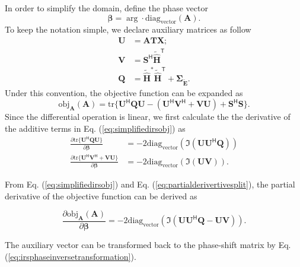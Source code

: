 \documentclass[12pt,draftclsnofoot,onecolumn,journal]{IEEEtran}
\begin{document}
In order to simplify the domain, define the phase vector
\begin{equation}
\boldsymbol \beta=\arg \cdot \mathrm{diag_{vector}}(\mathbf A).
\end{equation}
To keep the notation simple, we declare auxiliary matrices as follow
\begin{equation}
\begin{split}
\mathbf U&= \mathbf{ATX};\\
\mathbf V&=\mathbf S^{\mathsf H}\tilde{\hat{\mathbf H}}^{\mathsf T}\\
\mathbf Q&=\tilde{\hat{\mathbf H}}^*\tilde{\hat{\mathbf H}}^{\mathsf T}+
\pmb{\Sigma_{\tilde{\mathbf E}}}.
\end{split}
\label{eq:irsgdsimplifiedsymbols}
\end{equation}
Under this convention, the objective function can be expanded as 
\begin{equation}
\mathrm{obj_{\mathbf A}}(\mathbf A)=\mathrm{tr}\{\mathbf U^{\mathsf H}\mathbf Q \mathbf U- (\mathbf U^{\mathsf H}\mathbf V^{\mathsf H}+\mathbf{VU})+\mathbf S^{\mathsf H}\mathbf S\}.
\label{eq:simplifiedirsobj}
\end{equation}
Since the differential operation is linear, we first calculate the the derivative of the additive terms in Eq. (\ref{eq:simplifiedirsobj}) as
\begin{equation}
\begin{split}
\frac{\partial \mathrm{tr}\{\mathbf U^{\mathsf H}\mathbf Q \mathbf U\}}{\partial\boldsymbol\beta} &= -2\mathrm{diag_{vector}}(\Im(\mathbf{UU^{\mathsf H}Q}))\\
\frac{\partial{\mathrm{tr}\{\mathbf U^{\mathsf H}\mathbf V^{\mathsf H}+\mathbf{VU}\}}}{\partial{\boldsymbol{\beta}}} &= -2\mathrm{diag_{vector}}(\Im(\mathbf{UV})).
\end{split}
\label{eq:partialderivertivesplit}
\end{equation}

From Eq. (\ref{eq:simplifiedirsobj}) and Eq. (\ref{eq:partialderivertivesplit}), the partial derivative of the objective function can be derived as

\begin{equation}
\frac{\partial \mathrm{obj_{\mathbf A}}(\mathbf A)}{\partial\boldsymbol\beta} = -2\mathrm{diag_{vector}}(\Im(\mathbf{UU^{\mathsf H}Q}-\mathbf{UV})).
\label{eq:partialderivertivetotal}
\end{equation}

The auxiliary vector can be transformed back to the phase-shift matrix by Eq. (\ref{eq:irsphaseinversetransformation}).
\end{document}
